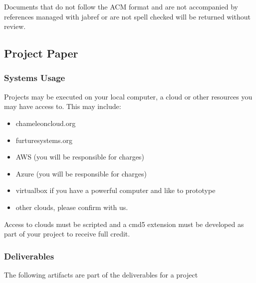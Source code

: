 Documents that do not follow the ACM format and are not accompanied by
references managed with jabref or are not spell checked will
be returned without review.

\subsection{Project Paper}

\subsubsection{Systems Usage}

Projects may be executed on your local computer, a cloud or other
resources you may have access to. This may include:

\begin{itemize}
\item chameleoncloud.org
\item furturesystems.org
\item AWS (you will be responsible for charges)
\item Azure (you will be responsible for charges)
\item virtualbox if you have a powerful computer and like to prototype
\item other clouds, please confirm with us.
\end{itemize}

Access to clouds must be scripted and a cmd5 extension must be
developed as part of your project to receive full credit.

\subsubsection{Deliverables}

The following artifacts are part of the deliverables for a project

